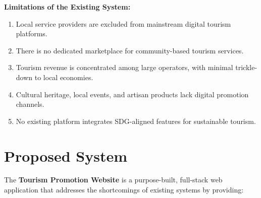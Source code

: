 \textbf{Limitations of the Existing System:}
\begin{enumerate}[leftmargin=2em]
    \item Local service providers are excluded from mainstream digital tourism platforms.
    \item There is no dedicated marketplace for community-based tourism services.
    \item Tourism revenue is concentrated among large operators, with minimal trickle-down to local economies.
    \item Cultural heritage, local events, and artisan products lack digital promotion channels.
    \item No existing platform integrates SDG-aligned features for sustainable tourism.
\end{enumerate}

\section{Proposed System}

The \textbf{Tourism Promotion Website} is a purpose-built, full-stack web application that addresses the shortcomings of existing systems by providing:

